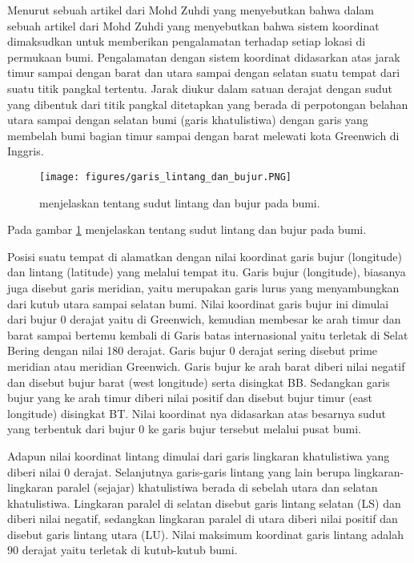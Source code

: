 	Menurut sebuah artikel dari Mohd Zuhdi yang menyebutkan bahwa dalam sebuah artikel dari Mohd Zuhdi yang menyebutkan bahwa sistem koordinat dimaksudkan 
untuk memberikan pengalamatan terhadap setiap lokasi di permukaan bumi. Pengalamatan dengan sistem koordinat didasarkan atas jarak timur sampai dengan barat 
dan utara sampai dengan selatan suatu tempat dari suatu titik pangkal tertentu. Jarak diukur dalam satuan derajat dengan sudut yang dibentuk dari titik 
pangkal ditetapkan yang berada di perpotongan belahan utara sampai dengan selatan bumi (garis khatulistiwa) dengan garis yang membelah bumi bagian timur sampai 
dengan barat melewati kota Greenwich di Inggris.

	
\begin{figure}[ht]
\centerline{\texttt{[image: figures/garis\_lintang\_dan\_bujur.PNG]}}
\caption{menjelaskan tentang sudut lintang dan bujur pada bumi.}
\label{garis_lintang_dan_bujur}
\end{figure}

Pada gambar \ref{garis_lintang_dan_bujur} menjelaskan tentang sudut lintang dan bujur pada bumi.

	Posisi suatu tempat di alamatkan dengan nilai koordinat garis bujur (longitude) dan lintang (latitude) yang melalui tempat itu. Garis bujur (longitude), 
biasanya juga disebut garis meridian, yaitu merupakan garis lurus yang menyambungkan dari kutub utara sampai selatan bumi. Nilai koordinat garis bujur ini dimulai dari
bujur 0 derajat yaitu di Greenwich, kemudian membesar ke arah timur dan barat sampai bertemu kembali di Garis batas internasional yaitu terletak 
di Selat Bering dengan nilai 180 derajat. Garis bujur 0 derajat sering disebut prime meridian atau meridian Greenwich. Garis bujur ke arah barat diberi 
nilai negatif dan disebut bujur barat (west longitude) serta disingkat BB. Sedangkan garis bujur yang ke arah timur diberi nilai positif 
dan disebut bujur timur (east longitude) disingkat BT. Nilai koordinat nya didasarkan atas besarnya sudut yang terbentuk dari bujur 0 ke garis bujur tersebut
 melalui pusat bumi.

	Adapun nilai koordinat lintang dimulai dari garis lingkaran khatulistiwa yang diberi nilai 0 derajat. Selanjutnya garis-garis lintang yang lain berupa 
lingkaran-lingkaran paralel (sejajar) khatulistiwa berada di sebelah utara dan selatan khatulistiwa. Lingkaran paralel di selatan disebut garis lintang selatan (LS)
dan diberi nilai negatif, sedangkan lingkaran paralel di utara diberi nilai positif dan disebut garis lintang utara (LU). Nilai maksimum koordinat 
garis lintang adalah 90 derajat yaitu terletak di kutub-kutub bumi.

